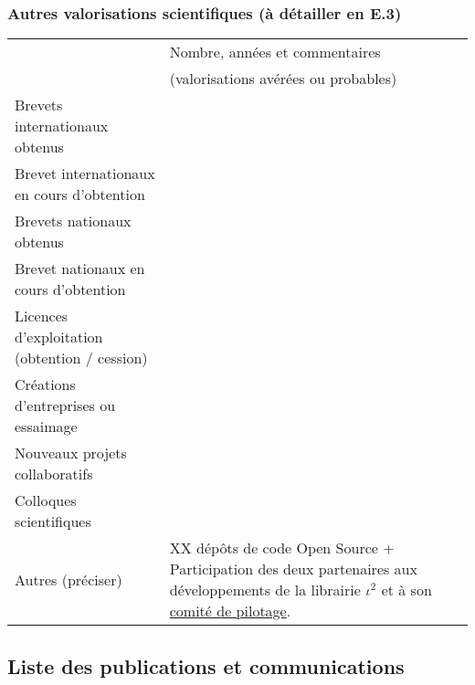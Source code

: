 \subsubsection*{Autres valorisations scientifiques (à détailler en E.3)} 

\begin{table}[htbp]
\small
    \centering
    \begin{tabular}{|p{5.5cm}|p{6cm}|}
    \hline
& Nombre, années et commentaires \\
&(valorisations avérées ou probables)\\\hline
Brevets internationaux obtenus& \\\hline
Brevet internationaux en cours d’obtention& \\\hline
Brevets nationaux obtenus& \\\hline
Brevet nationaux en cours d’obtention& \\\hline
Licences d’exploitation (obtention / cession)& \\\hline
Créations d’entreprises ou essaimage& \\\hline
Nouveaux projets collaboratifs & \\\hline
Colloques scientifiques& \\\hline
Autres (préciser)& XX dépôts de code Open Source + Participation des deux partenaires aux développements de la librairie $\iota^2$ et à son \href{https://framagit.org/iota2-project/iota2/-/wikis/Project-Steering-Committee}{comité de pilotage}. \\
\hline
    \end{tabular}
    \label{tab:valo_other}
\end{table}


\subsection{Liste des publications et communications}

\printbibliography[keyword={LASTIG-CESBIO-j},title={Journaux}]
\printbibliography[keyword={LASTIG-CESBIO-c},title={Conférences}]
\printbibliography[keyword={LASTIG-CESBIO-a},title={Autres communications}]

